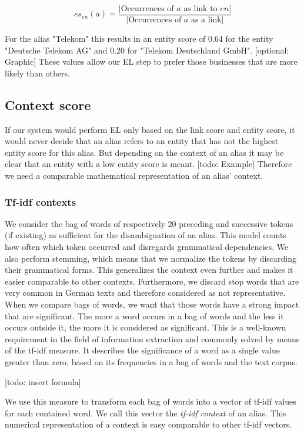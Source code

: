 \begin{equation*}
es_{en}(a) = \frac{|\text{Occurrences of $a$ as link to $en$}|}{|\text{Occurrences of $a$ as a link}|}
\end{equation*}

For the alias "Telekom" this results in an entity score of 0.64 for the entity "Deutsche Telekom AG" and 0.20 for "Telekom Deutschland GmbH". [optional: Graphic] These values allow our EL step to prefer those businesses that are more likely than others.\\


\subsection{Context score}
\label{sec:context_score}
If our system would perform EL only based on the link score and entity score, it would never decide that an alias refers to an entity that has not the highest entity score for this alias. But depending on the context of an alias it may be clear that an entity with a low entity score is meant. [todo: Example] Therefore we need a comparable mathematical representation of an alias' context.


\subsubsection{Tf-idf contexts}
We consider the bag of words of respectively 20 preceding and successive tokens (if existing) as sufficient for the disambiguation of an alias. This model counts how often which token occurred and disregards grammatical dependencies. We also perform stemming, which means that we normalize the tokens by discarding their grammatical forms. This generalizes the context even further and makes it easier comparable to other contexts. Furthermore, we discard stop words that are very common in German texts and therefore considered as not representative. When we compare bags of words, we want that those words have a strong impact that are significant. The more a word occurs in a bag of words and the less it occurs outside it, the more it is considered as significant. This is a well-known requirement in the field of information extraction and commonly solved by means of the tf-idf measure. It describes the significance of a word as a single value greater than zero, based on its frequencies in a bag of words and the text corpus.

[todo: insert formula]

We use this measure to transform each bag of words into a vector of tf-idf values for each contained word. We call this vector the \textit{tf-idf context} of an alias. This numerical representation of a context is easy comparable to other tf-idf vectors.


